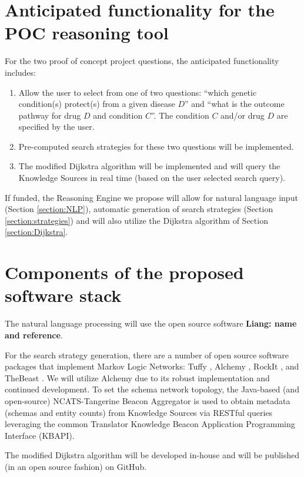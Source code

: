 \documentclass[11pt,notitlepage]{article}
\begin{document}
\section{Anticipated functionality for the POC reasoning tool}
For the two proof of concept project questions, the anticipated functionality includes:
\begin{enumerate}
\item Allow the user to select from one of two questions: ``which genetic
  condition(s) protect(s) from a given disease $D$'' and ``what is the outcome
  pathway for drug $D$ and condition $C$''. The condition $C$ and/or drug $D$
  are specified by the user.
\item Pre-computed search strategies for these two questions will be implemented.
\item The modified Dijkstra algorithm will be implemented and will query the
  Knowledge Sources in real time (based on the user selected search query).
\end{enumerate}
If funded, the Reasoning Engine we propose will allow for natural language input
(Section \ref{section:NLP}), automatic generation of search strategies (Section
\ref{section:strategies}) and will also utilize the Dijkstra algorithm of
Section \ref{section:Dijkstra}.

\section{Components of the proposed software stack}
The natural language processing will use the open source software \textbf{Liang: name and reference}.

For the search strategy generation, there are a number of open source software
packages that implement Markov Logic Networks: Tuffy
\cite{DBLP:journals/pvldb/NiuRDS11}, Alchemy \cite{kok2006alchemy}, RockIt
\cite{noessner2013rockit}, and TheBeast \cite{riedel08improving}. We will
utilize Alchemy due to its robust implementation and continued development. To
set the schema network topology, the Java-based (and open-source)
NCATS-Tangerine Beacon Aggregator is used to obtain metadata (schemas and entity
counts) from Knowledge Sources via RESTful queries leveraging the common
Translator Knowledge Beacon Application Programming Interface (KBAPI).
 
The modified Dijkstra algorithm will be developed in-house and will be published (in an open source fashion) on GitHub.
\end{document}
